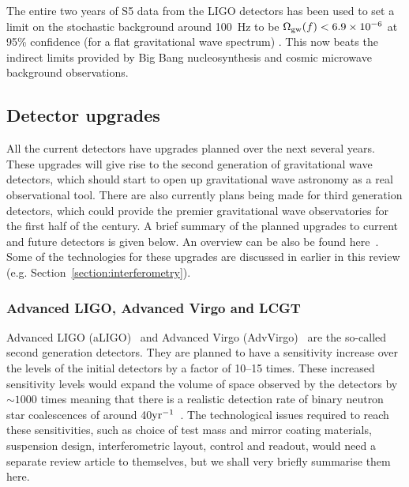 \documentclass{article}
\begin{document}
The entire two years of S5 data from the LIGO detectors has been used to set a
limit on the stochastic background around 100~Hz to be $\Omega_{\rm gw}(f) <
6.9\times10^{-6}$ at 95\% confidence (for a flat gravitational wave spectrum)
\cite{Abbott:2009b}. This now beats the indirect limits provided by Big Bang
nucleosynthesis and cosmic microwave background observations.

\subsection{Detector upgrades}

All the current detectors have upgrades planned over the next several years.
These upgrades will give rise to the second generation of gravitational wave
detectors, which should start to open up gravitational wave astronomy as a
real observational tool. There are also currently plans being made for third
generation detectors, which could provide the premier gravitational wave
observatories for the first half of the century. A brief summary of the planned
upgrades to current and future detectors is given below. An overview can be also
be found here~\cite{Whitcomb:2008}. Some of the technologies for these upgrades
are discussed in earlier in this review (e.g. Section~\ref{section:interferometry}).

\subsubsection{Advanced LIGO, Advanced Virgo and LCGT}
\label{subsection:aligo}

Advanced LIGO (aLIGO)~\cite{Harry:2010, AdvLIGO, AdvLIGOweb} and Advanced Virgo
(AdvVirgo)~\cite{AdvVirgo, AdvVirgoweb} are the so-called second generation
detectors. They are planned to have a sensitivity increase over the levels of
the initial detectors by a factor of 10--15 times. These increased sensitivity
levels would expand the volume of space observed by the detectors by $\sim1000$
times meaning that there is a realistic detection rate of binary neutron star
coalescences of around 40${\rm yr}^{-1}$~\cite{Abadie:2010e, Kopparapu:2008}.
The technological issues required to reach these sensitivities, such as choice
of test mass and mirror coating materials, suspension design, interferometric
layout, control and readout, would need a separate review article to themselves,
but we shall very briefly summarise them here.
\end{document}
